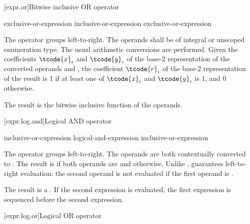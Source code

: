 [expr.or]{Bitwise inclusive OR operator}%
%
%

\begin{bnf}
\br
    exclusive-or-expression\br
    inclusive-or-expression \terminal{|} exclusive-or-expression
\end{bnf}

\pnum
The \tcode{|} operator groups left-to-right.
The operands shall be of integral or unscoped enumeration type.
The usual arithmetic conversions are performed.
Given the coefficients $\tcode{x}_i$ and $\tcode{y}_i$
of the base-2 representation
of the converted operands  and ,
the coefficient $\tcode{r}_i$
of the base-2 representation of the result 
is 1 if at least one of $\tcode{x}_i$ and $\tcode{y}_i$ is 1, and 0 otherwise.
\begin{note}
The result is the bitwise inclusive  function of the operands.
\end{note}

[expr.log.and]{Logical AND operator}%
%
%
%

\begin{bnf}
\br
    inclusive-or-expression\br
    logical-and-expression \terminal{\&\&} inclusive-or-expression
\end{bnf}

\pnum
The \tcode{\&\&} operator groups left-to-right. The operands are both
contextually converted to .
The
result is  if both operands are  and
 otherwise. Unlike \tcode{\&}, \tcode{\&\&} guarantees
left-to-right evaluation: the second operand is not evaluated if the
first operand is .

\pnum
The result is a .
%
If the second expression is evaluated,
the first expression is sequenced before
the second expression.

[expr.log.or]{Logical OR operator}%
%
%
%

